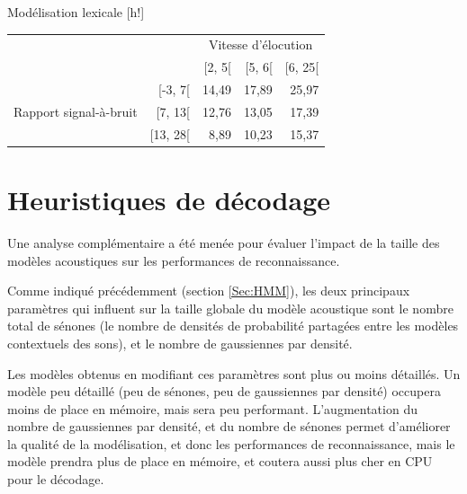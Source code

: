\documentclass{style/these}
\makeatletter
\renewcommand\familydefault{ptm}
\renewenvironment{table}%
{ \renewcommand{\familydefault}{ptm}\selectfont
  \@float{table}}
  {\end@float}
\makeatother
\begin{document}
\begin{part}{Modélisation lexicale}
\begin{table}[h!]
\centering
\begin{tabular}{r|r|r|r|r|}
\multicolumn{1}{c}{} & \multicolumn{1}{c}{}		& \multicolumn{3}{c}{Vitesse d'élocution} 	\\ \cline{3-5}
\multicolumn{1}{c}{} & \multicolumn{1}{c|}{}		& [2, 5[ 	& [5, 6[	& [6, 25[	\\ \cline{2-5}
\multirow{3}{*}{Rapport signal-à-bruit}	& [-3, 7[	& 14,49		& 17,89		& 25,97		\\ \cline{2-5}
					& [7, 13[	& 12,76		& 13,05		& 17,39		\\ \cline{2-5}
					& [13, 28[	&  8,89		& 10,23		& 15,37		\\ \cline{2-5}
\end{tabular}
\caption{Taux d'erreur phonétique obtenus avec les modèles de langage grand vocabulaire sur les corpus ETAPE en fonction du rapport signal-à-bruit et de la vitesse d'élocution}
\label{Tab:comb-SnR-SR}
\end{table}


\section{Heuristiques de décodage}
\label{Sec:HD}
\renewcommand{\rightmark}{Heuristiques de décodage}

Une analyse complémentaire a été menée pour évaluer l'impact de la taille des modèles acoustiques sur les performances de reconnaissance. 

Comme indiqué précédemment (section \ref{Sec:HMM}), les deux principaux paramètres qui influent sur la taille globale du modèle acoustique sont le nombre total de sénones (le nombre de densités de probabilité partagées entre les modèles contextuels des sons), et le nombre de gaussiennes par densité.

Les modèles obtenus en modifiant ces paramètres sont plus ou moins détaillés. 
Un modèle peu détaillé (peu de sénones, peu de gaussiennes par densité) occupera moins de place en mémoire, mais sera peu performant. 
L'augmentation du nombre de gaussiennes par densité, et du nombre de sénones permet d'améliorer la qualité de la modélisation, et donc les performances de reconnaissance, mais le modèle prendra plus de place en mémoire, et coutera aussi plus cher en CPU pour le décodage.


\end{part}
\end{document}
